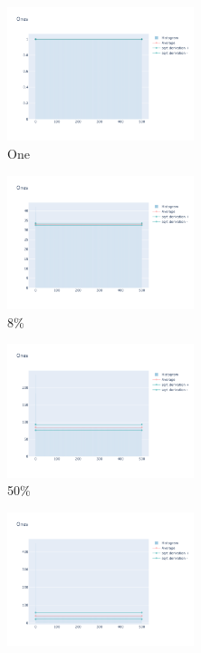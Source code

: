 \documentclass[12pt, fleqn]{report}                             %
\theoremstyle{break}                                            %
\begin{document}
      \begin{figure}[ht!]
        \centering
        \begin{subfigure}[b]{0.4\linewidth}
          \includegraphics[width=0.6\textwidth]{Images/44/dia-a.png}
          \caption{One}
        \end{subfigure}
        \begin{subfigure}[b]{0.4\linewidth}
          \includegraphics[width=0.6\textwidth]{Images/44/dia-b.png}
          \caption{8\%}
        \end{subfigure}
        \begin{subfigure}[b]{0.4\linewidth}
          \includegraphics[width=0.6\textwidth]{Images/44/dia-c.png}
          \caption{50\%}
        \end{subfigure}
        \begin{subfigure}[b]{0.4\linewidth}
          \includegraphics[width=0.6\textwidth]{Images/44/dia-d.png}

\end{subfigure}
\end{figure}
\end{document}

